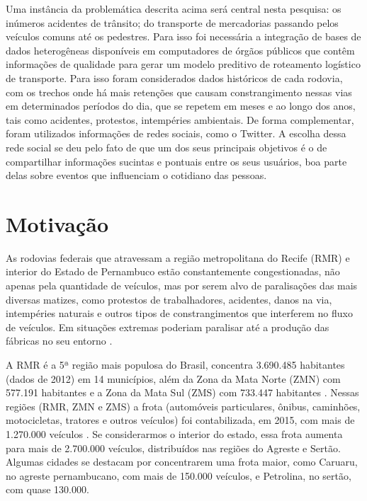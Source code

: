 Uma instância da problemática descrita acima será central nesta pesquisa: os inúmeros acidentes de trânsito; do transporte de mercadorias passando pelos veículos comuns até os pedestres. Para isso foi necessária a integração de bases de dados heterogêneas disponíveis em computadores de órgãos públicos que contêm informações de qualidade para gerar um modelo preditivo de roteamento logístico de transporte. Para isso foram considerados dados históricos de cada rodovia, com os trechos onde há mais 
retenções que causam constrangimento nessas vias em determinados períodos do dia, que se repetem em meses e ao longo dos anos, tais como acidentes, protestos, intempéries ambientais.
De forma complementar, foram utilizados informações de redes sociais, como o Twitter. A escolha dessa rede social se deu pelo fato de que um dos seus principais objetivos é o de compartilhar informações sucintas e pontuais entre os seus usuários, boa parte delas sobre eventos que influenciam o cotidiano das pessoas.



\section{ Motivação}\label{intro:motivacao}

As rodovias federais que atravessam a região metropolitana do Recife (RMR) e interior do Estado de Pernambuco estão constantemente congestionadas, não apenas pela 
quantidade de veículos, mas por serem alvo de paralisações das mais diversas matizes, como protestos de trabalhadores, acidentes, danos na via, intempéries naturais e outros tipos de constrangimentos que interferem no fluxo de veículos. 
Em situações extremas poderiam paralisar até a produção das fábricas no seu entorno \cite{BNDES2013}. 

A RMR é a 5ª região mais populosa do Brasil, concentra 3.690.485 habitantes (dados de 2012) em 14 municípios, além da 
Zona da Mata Norte (ZMN) com 577.191 habitantes e a Zona da Mata Sul (ZMS) com 733.447 habitantes \cite{Bitoun2012}. 
Nessas regiões (RMR, ZMN e ZMS) a frota (automóveis particulares, ônibus, caminhões, motocicletas, tratores e outros veículos) 
foi contabilizada, em 2015, com mais de 1.270.000 veículos \cite{FrotaVeiculosIBGE}. Se considerarmos o interior do estado, essa frota aumenta para mais de 2.700.000 veículos, distribuídos nas regiões do Agreste e Sertão. Algumas cidades se destacam por concentrarem uma frota maior, como Caruaru, no agreste pernambucano, com mais de 150.000 veículos, e Petrolina, no sertão, com quase 130.000. 
																			

